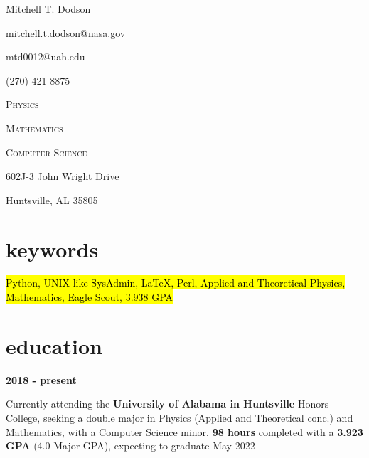 \documentclass[9pt]{article}
\newcommand{\entry}[2]{
	\begin{minipage}[c]{.14\textwidth}
		{\small\textbf{#1}}\hfill
	\end{minipage}
	{\color{OliveGreen}\hfill \vline \hfill}
	\begin{minipage}[c]{.8\textwidth}
		#2
	\end{minipage}\vspace{.12in}
	}
\begin{document}
\begin{center}
	{\color{OliveGreen}\Huge{Mitchell T. Dodson}}

	\vspace{1em}

	\begin{minipage}[t]{.33\textwidth}

		mitchell.t.dodson@nasa.gov

		mtd0012@uah.edu

		(270)-421-8875

	\end{minipage}
	\begin{minipage}[t]{.20\textwidth}\begin{centering}

		\textsc{Physics}

		\textsc{Mathematics}

		\textsc{Computer Science}


	\end{centering}\end{minipage}
	\begin{minipage}[t]{.33\textwidth}

		\hfill
		602J-3 John Wright Drive

		\hfill
		Huntsville, AL 35805

	\end{minipage}
\end{center}

\section{keywords}
\textit{}
\begin{centering}

	\hl{Python, UNIX-like SysAdmin, LaTeX, Perl, Applied and Theoretical Physics, Mathematics, Eagle Scout, 3.938 GPA}

\end{centering}
\section{education}
\textit{}

	\entry{2018 - present}{Currently attending the \textbf{University of Alabama in Huntsville} Honors College, seeking a double major in Physics (Applied and Theoretical conc.) and Mathematics, with a Computer Science minor. \textbf{98 hours} completed with a \textbf{3.923 GPA} (4.0 Major GPA), expecting to graduate May 2022}
\end{document}
